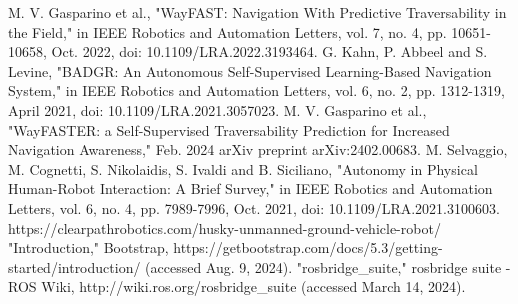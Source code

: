 \documentclass[letterpaper, 10 pt, conference]{ieeeconf}  %
\begin{document}










\begin{thebibliography}{99}

 M. V. Gasparino et al., "WayFAST: Navigation With Predictive Traversability in the Field," in IEEE Robotics and Automation Letters, vol. 7, no. 4, pp. 10651-10658, Oct. 2022, doi: 10.1109/LRA.2022.3193464.
 G. Kahn, P. Abbeel and S. Levine, "BADGR: An Autonomous Self-Supervised Learning-Based Navigation System," in IEEE Robotics and Automation Letters, vol. 6, no. 2, pp. 1312-1319, April 2021, doi: 10.1109/LRA.2021.3057023.
 M. V. Gasparino et al., "WayFASTER: a Self-Supervised Traversability Prediction for Increased Navigation Awareness," Feb. 2024 arXiv preprint arXiv:2402.00683.
 M. Selvaggio, M. Cognetti, S. Nikolaidis, S. Ivaldi and B. Siciliano, "Autonomy in Physical Human-Robot Interaction: A Brief Survey," in IEEE Robotics and Automation Letters, vol. 6, no. 4, pp. 7989-7996, Oct. 2021, doi: 10.1109/LRA.2021.3100603.
https://clearpathrobotics.com/husky-unmanned-ground-vehicle-robot/
"Introduction," Bootstrap, https://getbootstrap.com/docs/5.3/getting-started/introduction/ (accessed Aug. 9, 2024).
"rosbridge\_suite," rosbridge suite - ROS Wiki, http://wiki.ros.org/rosbridge\_suite (accessed March 14, 2024).






\end{thebibliography}
\end{document}
